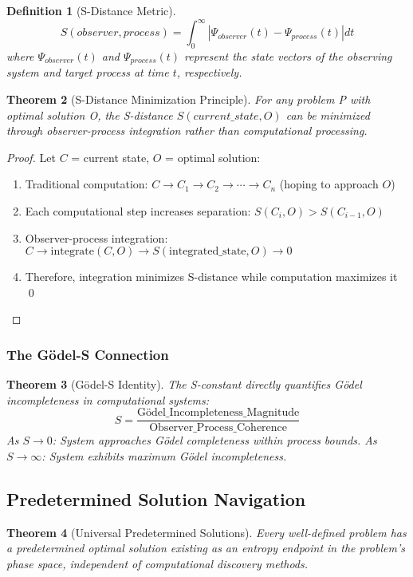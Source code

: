 \documentclass[12pt,a4paper]{article}
\newtheorem{theorem}{Theorem}[section]
\newtheorem{definition}[theorem]{Definition}
\begin{document}
{{{{{{{{{{{{{{\begin{definition}[S-Distance Metric]
$$S(observer, process) = \int_0^{\infty} |\Psi_{observer}(t) - \Psi_{process}(t)| dt$$
where $\Psi_{observer}(t)$ and $\Psi_{process}(t)$ represent the state vectors of the observing system and target process at time $t$, respectively.
\end{definition}

\begin{theorem}[S-Distance Minimization Principle]
For any problem P with optimal solution O, the S-distance $S(current\_state, O)$ can be minimized through observer-process integration rather than computational processing.
\end{theorem}

\begin{proof}
Let $C$ = current state, $O$ = optimal solution:
\begin{enumerate}
\item Traditional computation: $C \to C_1 \to C_2 \to \cdots \to C_n$ (hoping to approach $O$)
\item Each computational step increases separation: $S(C_i, O) > S(C_{i-1}, O)$
\item Observer-process integration: $C \to \text{integrate}(C, O) \to S(\text{integrated\_state}, O) \to 0$
\item Therefore, integration minimizes S-distance while computation maximizes it \qed
\end{enumerate}
\end{proof}

\subsubsection{The Gödel-S Connection}

\begin{theorem}[Gödel-S Identity]
The S-constant directly quantifies Gödel incompleteness in computational systems:
$$S = \frac{\text{Gödel\_Incompleteness\_Magnitude}}{\text{Observer\_Process\_Coherence}}$$
As $S \to 0$: System approaches Gödel completeness within process bounds.
As $S \to \infty$: System exhibits maximum Gödel incompleteness.
\end{theorem}

\subsection{Predetermined Solution Navigation}

\begin{theorem}[Universal Predetermined Solutions]
Every well-defined problem has a predetermined optimal solution existing as an entropy endpoint in the problem's phase space, independent of computational discovery methods.
\end{theorem}

}}}}}}}}}}}}}}
\end{document}
